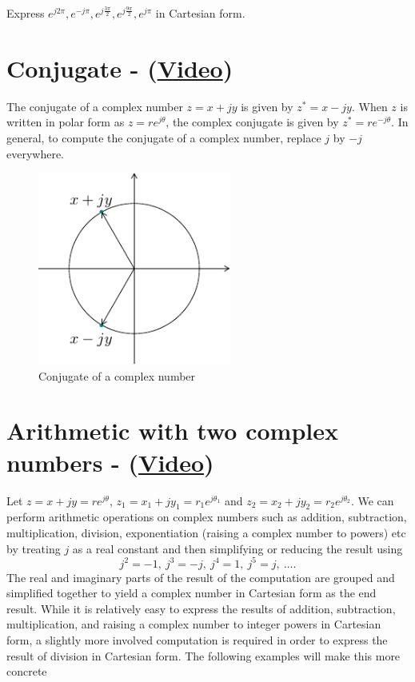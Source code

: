 \begin{example}
Express $e^{j 2 \pi}, e^{-j \pi}, e^{j \frac{3 \pi}{2}}, e^{j \frac{9 \pi}{2}}, e^{j \pi}$ in Cartesian form.
\end{example}

\newpage

\section{Conjugate - (\href{https://youtu.be/Bhkp4Bs1SKg}{Video})}
The conjugate of a complex number $z = x + j y$ is given by
$z^* = x - j y$. When $z$ is written in polar form as $z = r e^{j \theta}$, the
complex conjugate is given by $z^* = r e^{-j \theta}$. In general, to compute the conjugate of a
complex number, replace $j$ by $-j$ everywhere.
\begin{figure}[hbt]
\begin{center}\includegraphics[width=2.5in]{../Images/ComplexNumbers/Fig_0_2.pdf}\end{center}
\caption{Conjugate of a complex number}
\label{fig:complexconjugate}
\end{figure}

\section{Arithmetic with two complex numbers - (\href{https://youtu.be/XFXuDNh4kOA}{Video})}
Let $z = x + j y = r e^{j \theta}$,  $z_1 = x_1 + j y_1 = r_1 e^{j \theta_1}$ and $z_2 = x_2 + j y_2  = r_2 e^{j \theta_2}$. 
We can perform arithmetic operations on complex numbers such as addition, subtraction, multiplication,
division, exponentiation (raising a complex number to powers) etc by treating $j$ as a real constant and
then simplifying or reducing the result using 
\[
j^2 = -1, \ j^3 = -j, \ j^4 = 1, \ j^5 = j, \ \ldots.
\]
The real and imaginary parts of the result of the computation are grouped and simplified together to yield 
a complex number in Cartesian form as the end result.  
While it is relatively easy to express the results of addition, subtraction, multiplication, and raising a complex number to integer powers in Cartesian form, a slightly more involved computation is required in order to express the result
of division in Cartesian form.
The following examples will make this more concrete

